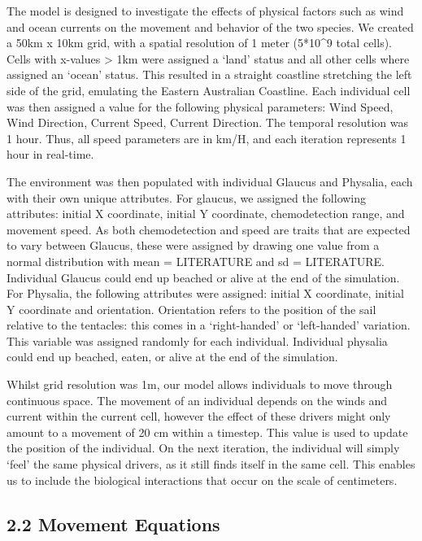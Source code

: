 \documentclass[
]{article}
\begin{document}
The model is designed to investigate the effects of physical factors
such as wind and ocean currents on the movement and behavior of the two
species. We created a 50km x 10km grid, with a spatial resolution of 1
meter (5*10\^{}9 total cells). Cells with x-values \textgreater{} 1km
were assigned a `land' status and all other cells where assigned an
`ocean' status. This resulted in a straight coastline stretching the
left side of the grid, emulating the Eastern Australian Coastline. Each
individual cell was then assigned a value for the following physical
parameters: Wind Speed, Wind Direction, Current Speed, Current
Direction. The temporal resolution was 1 hour. Thus, all speed
parameters are in km/H, and each iteration represents 1 hour in
real-time.

The environment was then populated with individual Glaucus and Physalia,
each with their own unique attributes. For glaucus, we assigned the
following attributes: initial X coordinate, initial Y coordinate,
chemodetection range, and movement speed. As both chemodetection and
speed are traits that are expected to vary between Glaucus, these were
assigned by drawing one value from a normal distribution with mean =
LITERATURE and sd = LITERATURE. Individual Glaucus could end up beached
or alive at the end of the simulation. For Physalia, the following
attributes were assigned: initial X coordinate, initial Y coordinate and
orientation. Orientation refers to the position of the sail relative to
the tentacles: this comes in a `right-handed' or `left-handed'
variation. This variable was assigned randomly for each individual.
Individual physalia could end up beached, eaten, or alive at the end of
the simulation.

Whilst grid resolution was 1m, our model allows individuals to move
through continuous space. The movement of an individual depends on the
winds and current within the current cell, however the effect of these
drivers might only amount to a movement of 20 cm within a timestep. This
value is used to update the position of the individual. On the next
iteration, the individual will simply `feel' the same physical drivers,
as it still finds itself in the same cell. This enables us to include
the biological interactions that occur on the scale of centimeters.

\hypertarget{movement-equations}{%
\subsection{2.2 Movement Equations}\label{movement-equations}}
\end{document}
